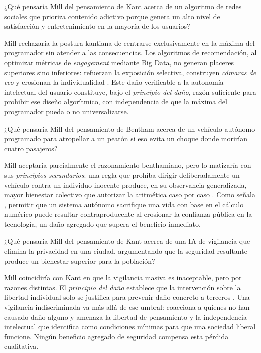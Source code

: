 \medskip

¿Qué pensaría Mill del pensamiento de Kant acerca de un algoritmo de redes sociales que prioriza contenido adictivo porque genera un alto nivel de satisfacción y entretenimiento en la mayoría de los usuarios?

Mill rechazaría la postura kantiana de centrarse exclusivamente en la máxima del programador sin atender a las consecuencias. Los algoritmos de recomendación, al optimizar métricas de \textit{engagement} mediante Big Data, no generan placeres superiores sino inferiores: refuerzan la exposición selectiva, construyen \textit{cámaras de eco} y erosionan la individualidad \citep{saetra2019tyranny}. Este daño verificable a la autonomía intelectual del usuario constituye, bajo el \textit{principio del daño}, razón suficiente para prohibir ese diseño algorítmico, con independencia de que la máxima del programador pueda o no universalizarse.

\medskip

¿Qué pensaría Mill del pensamiento de Bentham acerca de un vehículo autónomo programado para atropellar a un peatón si eso evita un choque donde morirían cuatro pasajeros?

Mill aceptaría parcialmente el razonamiento benthamiano, pero lo matizaría con sus \textit{principios secundarios}: una regla que prohíba dirigir deliberadamente un vehículo contra un individuo inocente produce, en su observancia generalizada, mayor bienestar colectivo que autorizar la aritmética caso por caso \citep{mill1863utilitarianism}. Como señala \citet{mishra2025moral}, permitir que un sistema autónomo sacrifique una vida con base en el cálculo numérico puede resultar contraproducente al erosionar la confianza pública en la tecnología, un daño agregado que supera el beneficio inmediato.

\medskip

¿Qué pensaría Mill del pensamiento de Kant acerca de una IA de vigilancia que elimina la privacidad en una ciudad, argumentando que la seguridad resultante produce un bienestar superior para la población?

Mill coincidiría con Kant en que la vigilancia masiva es inaceptable, pero por razones distintas. El \textit{principio del daño} establece que la intervención sobre la libertad individual solo se justifica para prevenir daño concreto a terceros \citep{mill2014utilitarismo}. Una vigilancia indiscriminada va más allá de ese umbral: coacciona a quienes no han causado daño alguno y amenaza la libertad de pensamiento y la independencia intelectual que \citet{saetra2019tyranny} identifica como condiciones mínimas para que una sociedad liberal funcione. Ningún beneficio agregado de seguridad compensa esta pérdida cualitativa.

